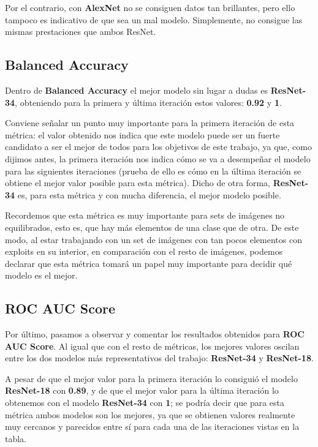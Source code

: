 Por el contrario, con \textbf{AlexNet} no se consiguen datos tan brillantes, pero ello tampoco es indicativo de que sea un mal modelo. Simplemente, no consigue las mismas prestaciones que ambos ResNet.

\subsection{Balanced Accuracy}

Dentro de \textbf{Balanced Accuracy} el mejor modelo sin lugar a dudas es \textbf{ResNet-34}, obteniendo para la primera y última iteración estos valores: \textbf{0.92} y \textbf{1}.

Conviene señalar un punto muy importante para la primera iteración de esta métrica: el valor obtenido nos indica que este modelo puede ser un fuerte candidato a ser el mejor de todos para los objetivos de este trabajo, ya que, como dijimos antes, la primera iteración nos indica cómo se va a desempeñar el modelo para las siguientes iteraciones (prueba de ello es cómo en la última iteración se obtiene el mejor valor posible para esta métrica). Dicho de otra forma, \textbf{ResNet-34} es, para esta métrica y con mucha diferencia, el mejor modelo posible.

Recordemos que esta métrica es muy importante para sets de imágenes no equilibrados, esto es, que hay más elementos de una clase que de otra. De este modo, al estar trabajando con un set de imágenes con tan pocos elementos con exploits en su interior, en comparación con el resto de imágenes, podemos declarar que esta métrica tomará un papel muy importante para decidir qué modelo es el mejor.

\subsection{ROC AUC Score}

Por último, pasamos a observar y comentar los resultados obtenidos para \textbf{ROC AUC Score}. Al igual que con el resto de métricas, los mejores valores oscilan entre los dos modelos más representativos del trabajo: \textbf{ResNet-34} y \textbf{ResNet-18}.

A pesar de que el mejor valor para la primera iteración lo consiguió el modelo \textbf{ResNet-18} con \textbf{0.89}, y de que el mejor valor para la última iteración lo obtenemos con el modelo \textbf{ResNet-34} con \textbf{1}; se podría decir que para esta métrica ambos modelos son los mejores, ya que se obtienen valores realmente muy cercanos y parecidos entre sí para cada una de las iteraciones vistas en la tabla.

